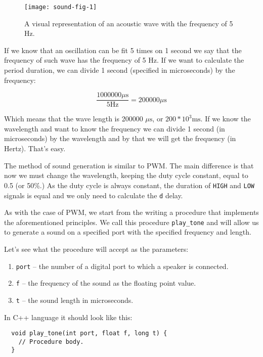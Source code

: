 \documentclass[../sparc.tex]{subfiles}
\begin{document}
\begin{figure}[h]
  \centering
  \texttt{[image: sound-fig-1]}
  \caption{A visual representation of an acoustic wave with the frequency of 5
    Hz.}
  \label{fig:sound-fig-1}
\end{figure}

If we know that an oscillation can be fit 5 times on 1 second we say that the
frequency of such wave has the frequency of 5 Hz.  If we want to calculate the
period duration, we can divide 1 second (specified in microseconds) by the
frequency:

\begin{equation}
  \frac{1000000 \mu\mbox{s}}{5 \mbox{Hz}} = 200000 \mu\mbox{s}
\end{equation}

Which means that the wave length is 200000 $\mu\mbox{s}$, or $ 200 * 10^3
\mbox{ms}$.  If we know the wavelength and want to know the frequency we can
divide 1 second (in microseconds) by the wavelength and by that we will get the
frequency (in Hertz).  That's easy.

The method of sound generation is similar to \gls{PWM}. The main difference is
that now we must change the wavelength, keeping the duty cycle constant, equal
to 0.5 (or 50\%.)  As the duty cycle is always constant, the duration of
\texttt{HIGH} and \texttt{LOW} signals is equal and we only need to calculate
the \texttt{d} delay.

As with the case of PWM, we start from the writing a procedure that implements
the aforementioned principles.  We call this procedure \texttt{play\_tone} and
will allow us to generate a sound on a specified port with the specified
frequency and length.

Let's see what the procedure will accept as the parameters:
\begin{enumerate}
\item \texttt{port} -- the number of a digital port to which a speaker is
  connected.
\item \texttt{f} -- the frequency of the sound as the floating point value.
\item \texttt{t} -- the sound length in microseconds.
\end{enumerate}

In C++ language it should look like this:
\begin{verbatim}
  void play_tone(int port, float f, long t) {
    // Procedure body.
  }
\end{verbatim}
\end{document}
